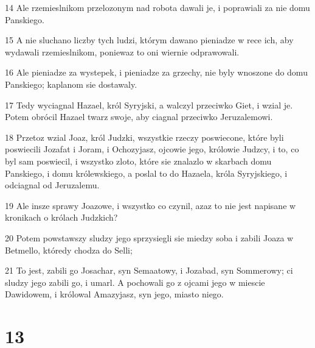 \par 14 Ale rzemieslnikom przelozonym nad robota dawali je, i poprawiali za nie domu Panskiego.
\par 15 A nie sluchano liczby tych ludzi, którym dawano pieniadze w rece ich, aby wydawali rzemieslnikom, poniewaz to oni wiernie odprawowali.
\par 16 Ale pieniadze za wystepek, i pieniadze za grzechy, nie byly wnoszone do domu Panskiego; kaplanom sie dostawaly.
\par 17 Tedy wyciagnal Hazael, król Syryjski, a walczyl przeciwko Giet, i wzial je. Potem obrócil Hazael twarz swoje, aby ciagnal przeciwko Jeruzalemowi.
\par 18 Przetoz wzial Joaz, król Judzki, wszystkie rzeczy poswiecone, które byli poswiecili Jozafat i Joram, i Ochozyjasz, ojcowie jego, królowie Judzcy, i to, co byl sam poswiecil, i wszystko zloto, które sie znalazlo w skarbach domu Panskiego, i domu królewskiego, a poslal to do Hazaela, króla Syryjskiego, i odciagnal od Jeruzalemu.
\par 19 Ale insze sprawy Joazowe, i wszystko co czynil, azaz to nie jest napisane w kronikach o królach Judzkich?
\par 20 Potem powstawszy sludzy jego sprzysiegli sie miedzy soba i zabili Joaza w Betmello, któredy chodza do Selli;
\par 21 To jest, zabili go Josachar, syn Semaatowy, i Jozabad, syn Sommerowy; ci sludzy jego zabili go, i umarl. A pochowali go z ojcami jego w miescie Dawidowem, i królowal Amazyjasz, syn jego, miasto niego.

\chapter{13}

